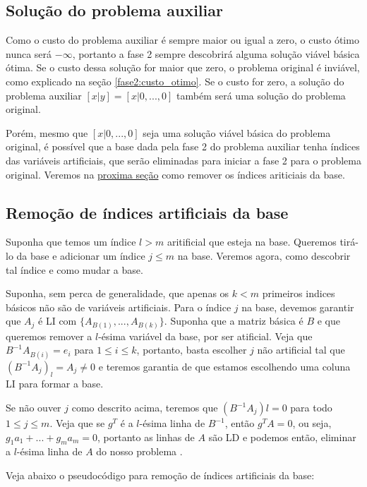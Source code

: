 \documentclass[12pt]{article}
\begin{document}
\subsection{Solução do problema auxiliar}
Como o custo do problema auxiliar é sempre maior ou igual a zero, o custo ótimo nunca será $-\infty$, portanto a fase 2 sempre descobrirá alguma solução viável básica ótima. Se o custo dessa solução for maior que zero, o problema original é inviável, como explicado na seção \ref{fase2:custo_otimo}. Se o custo for zero, a solução do problema auxiliar $[x|y] = [x | 0, ..., 0]$ também será uma solução do problema original. 

Porém, mesmo que $[x | 0, ..., 0]$ seja uma solução viável básica do problema original, é possível que a base dada pela fase 2 do problema auxiliar tenha índices das variáveis artificiais, que serão eliminadas para iniciar a fase 2 para o problema original. Veremos na \hyperref[rm_artificiais]{proxima seção} como remover os índices ariticiais da base.

\subsection{Remoção de índices artificiais da base}
\label{fase2:rm_artificiais}
Suponha que temos um índice $l > m$ aritificial que esteja na base. Queremos tirá-lo da base e adicionar um índice $j \leq m$ na base. Veremos agora, como descobrir tal índice e como mudar a base.

Suponha, sem perca de generalidade, que apenas os $k < m$ primeiros indices básicos não são de variáveis artificiais. Para o índice $j$ na base, devemos garantir que $A_{j}$ é LI com $\{A_{B(1)}, ..., A_{B(k)}\}$. Suponha que a matriz básica é $B$ e que queremos remover a $l$-ésima variável da base, por ser atificial. Veja que $B^{-1}A_{B(i)} = e_i$ para $1 \leq i \leq k$, portanto, basta escolher $j$ não artificial tal que $(B^{-1}A_j)_l = A_j  \neq 0$ e teremos garantia de que estamos escolhendo uma coluna LI para formar a base.

Se não ouver $j$ como descrito acima, teremos que $(B^{-1}A_j)l = 0$ para todo $1 \leq j \leq m$. Veja que se $g^T$ é a $l$-ésima linha de $B^{-1}$, então $g^TA = 0$, ou seja, $g_1a_1 + ... + g_ma_m = 0$, portanto as linhas de $A$ são LD e podemos então, eliminar a $l$-ésima linha de $A$ do nosso problema \cite{315book}.

Veja abaixo o pseudocódigo para remoção de índices artificiais da base:
\bigskip
\end{document}
